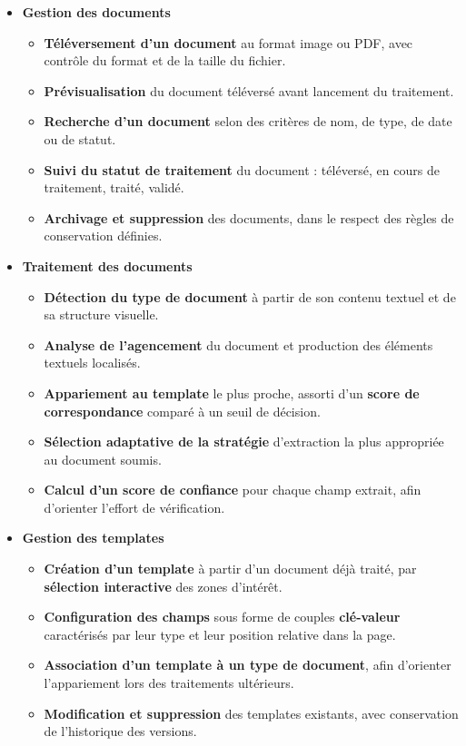 \begin{itemize}
    \item[\opplume] \textbf{Gestion des documents}
    \begin{itemize}
        \item[\opmanicule] \textbf{Téléversement d'un document} au format image ou PDF, avec
        contrôle du format et de la taille du fichier.
        \item[\opmanicule] \textbf{Prévisualisation} du document téléversé avant lancement du
        traitement.
        \item[\opmanicule] \textbf{Recherche d'un document} selon des critères de nom, de
        type, de date ou de statut.
        \item[\opmanicule] \textbf{Suivi du statut de traitement} du document : téléversé, en
        cours de traitement, traité, validé.
        \item[\opmanicule] \textbf{Archivage et suppression} des documents, dans le respect
        des règles de conservation définies.
    \end{itemize}

    \item[\opplume] \textbf{Traitement des documents}
    \begin{itemize}
        \item[\opmanicule] \textbf{Détection du type de document} à partir de son contenu
        textuel et de sa structure visuelle.
        \item[\opmanicule] \textbf{Analyse de l'agencement} du document et production des
        éléments textuels localisés.
        \item[\opmanicule] \textbf{Appariement au template} le plus proche, assorti d'un
        \textbf{score de correspondance} comparé à un seuil de décision.
        \item[\opmanicule] \textbf{Sélection adaptative de la stratégie} d'extraction la plus
        appropriée au document soumis.
        \item[\opmanicule] \textbf{Calcul d'un score de confiance} pour chaque champ extrait,
        afin d'orienter l'effort de vérification.
    \end{itemize}

    \item[\opplume] \textbf{Gestion des templates}
    \begin{itemize}
        \item[\opmanicule] \textbf{Création d'un template} à partir d'un document déjà traité,
        par \textbf{sélection interactive} des zones d'intérêt.
        \item[\opmanicule] \textbf{Configuration des champs} sous forme de couples
        \textbf{clé-valeur} caractérisés par leur type et leur position relative dans la page.
        \item[\opmanicule] \textbf{Association d'un template à un type de document}, afin
        d'orienter l'appariement lors des traitements ultérieurs.
        \item[\opmanicule] \textbf{Modification et suppression} des templates existants, avec
        conservation de l'historique des versions.
    \end{itemize}


\end{itemize}
